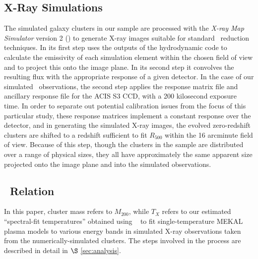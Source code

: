 \documentclass[12pt,preprint]{aastex}
\begin{document}
\subsection{X-Ray Simulations}

The simulated galaxy clusters in our sample are processed with the
\emph{X-ray Map Simulator} version 2 ()
\citep{gardini_simulating_2004,rasia_x-mas2:_2008} to generate X-ray
images suitable for standard \chandra\ reduction techniques.  In its
first step  uses the outputs of the hydrodynamic code to
calculate the emissivity of each simulation element within the chosen
field of view and to project this onto the image plane.  In its second
step it convolves the resulting flux with the appropriate response of
a given detector.  In the case of our simulated \chandra\
observations, the second step applies the response matrix file and
ancillary response file for the ACIS S3 CCD, with a 200 kilosecond
exposure time.  In order to separate out potential calibration issues
from the focus of this particular study, these response matrices
implement a constant response over the detector, and in generating the
simulated X-ray images, the evolved zero-redshift clusters are shifted
to a redshift sufficient to fit $R_{500}$ within the 16 arcminute
field of view.  Because of this step, though the clusters in the
sample are distributed over a range of physical sizes, they all have
approximately the same apparent size projected onto the image plane
and into the simulated observations.

\subsection{\mtx\ Relation}
In this paper, cluster mass refers to $M_{200}$, while $T_X$ refers to
our estimated ``spectral-fit temperatures'' obtained using \xspec\
\citep{1996ASPC..101...17A} to fit single-temperature MEKAL plasma
models to various energy bands in simulated \xmas2 X-ray observations
taken from the numerically-simulated clusters.  The steps involved in
the process are described in detail in $\S$ \ref{sec:analysis}.
\end{document}

